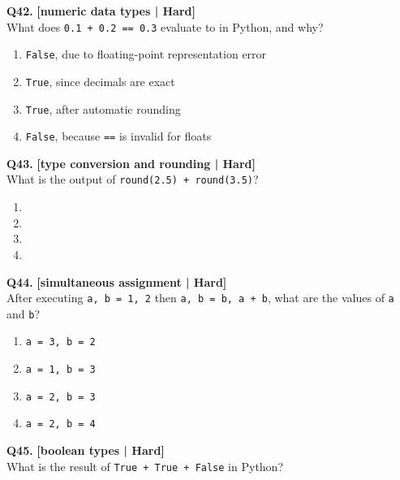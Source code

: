 \noindent\textbf{Q42.} \hfill {\small\color{LPUOrange}\textbf{[numeric data types | Hard]}}\\[2pt]
What does \texttt{0.1 + 0.2 == 0.3} evaluate to in Python, and why?

\begin{enumerate}[label=(\alph*),topsep=2pt,itemsep=1pt,partopsep=0pt,parsep=0pt]
    \item \relax \texttt{False}, due to floating-point representation error
    \item \relax \texttt{True}, since decimals are exact
    \item \relax \texttt{True}, after automatic rounding
    \item \relax \texttt{False}, because \texttt{==} is invalid for floats
\end{enumerate}
\vspace{2mm}

\noindent\textbf{Q43.} \hfill {\small\color{LPUOrange}\textbf{[type conversion and rounding | Hard]}}\\[2pt]
What is the output of \texttt{round(2.5) + round(3.5)}?

\begin{enumerate}[label=(\alph*),topsep=2pt,itemsep=1pt,partopsep=0pt,parsep=0pt]
    \item {}
    \item {}
    \item {}
    \item {}
\end{enumerate}
\vspace{2mm}

\noindent\textbf{Q44.} \hfill {\small\color{LPUOrange}\textbf{[simultaneous assignment | Hard]}}\\[2pt]
After executing \texttt{a, b = 1, 2} then \texttt{a, b = b, a + b}, what are the values of \texttt{a} and \texttt{b}?

\begin{enumerate}[label=(\alph*),topsep=2pt,itemsep=1pt,partopsep=0pt,parsep=0pt]
    \item \relax \texttt{a = 3, b = 2}
    \item \relax \texttt{a = 1, b = 3}
    \item \relax \texttt{a = 2, b = 3}
    \item \relax \texttt{a = 2, b = 4}
\end{enumerate}
\vspace{2mm}

\noindent\textbf{Q45.} \hfill {\small\color{LPUOrange}\textbf{[boolean types | Hard]}}\\[2pt]
What is the result of \texttt{True + True + False} in Python?

